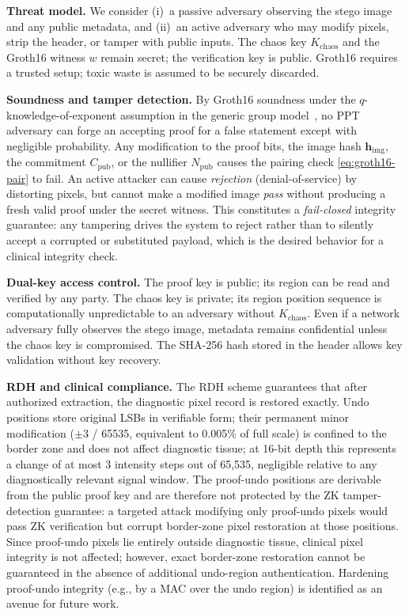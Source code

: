 \documentclass{jstarticle}
\begin{document}
\textbf{Threat model.}
We consider (i)~a passive adversary observing the stego image and any public metadata, and (ii)~an active adversary who may modify pixels, strip the header, or tamper with public inputs.
The chaos key $K_{\text{chaos}}$ and the Groth16 witness $w$ remain secret; the verification key is public.
Groth16 requires a trusted setup; toxic waste is assumed to be securely discarded.

\textbf{Soundness and tamper detection.}
By Groth16 soundness under the $q$-knowledge-of-exponent assumption in the generic group model~\cite{b8}, no PPT adversary can forge an accepting proof for a false statement except with negligible probability.
Any modification to the proof bits, the image hash $\mathbf{h}_{\text{img}}$, the commitment $C_{\text{pub}}$, or the nullifier $N_{\text{pub}}$ causes the pairing check \eqref{eq:groth16-pair} to fail.
An active attacker can cause \emph{rejection} (denial-of-service) by distorting pixels, but cannot make a modified image \emph{pass} without producing a fresh valid proof under the secret witness.
This constitutes a \emph{fail-closed} integrity guarantee: any tampering drives the system to reject rather than to silently accept a corrupted or substituted payload, which is the desired behavior for a clinical integrity check.

\textbf{Dual-key access control.}
The proof key is public; its region can be read and verified by any party.
The chaos key is private; its region position sequence is computationally unpredictable to an adversary without $K_{\text{chaos}}$.
Even if a network adversary fully observes the stego image, metadata remains confidential unless the chaos key is compromised.
The SHA-256 hash stored in the header allows key validation without key recovery.

\textbf{RDH and clinical compliance.}
The RDH scheme guarantees that after authorized extraction, the diagnostic pixel record is restored exactly.
Undo positions store original LSBs in verifiable form; their permanent minor modification ($\pm 3$ / 65535, equivalent to 0.005\% of full scale) is confined to the border zone and does not affect diagnostic tissue; at 16-bit depth this represents a change of at most 3 intensity steps out of 65,535, negligible relative to any diagnostically relevant signal window.
The proof-undo positions are derivable from the public proof key and are therefore not protected by the ZK tamper-detection guarantee: a targeted attack modifying only proof-undo pixels would pass ZK verification but corrupt border-zone pixel restoration at those positions.
Since proof-undo pixels lie entirely outside diagnostic tissue, clinical pixel integrity is not affected; however, exact border-zone restoration cannot be guaranteed in the absence of additional undo-region authentication.
Hardening proof-undo integrity (e.g., by a MAC over the undo region) is identified as an avenue for future work.
\end{document}

